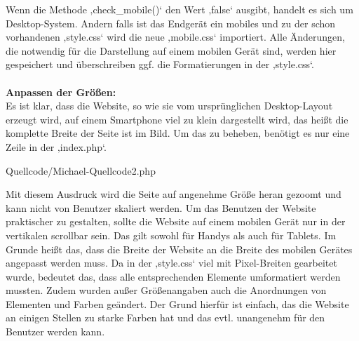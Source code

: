 Wenn die Methode ‚check\_mobile()‘ den Wert ‚false‘ ausgibt, handelt es sich um Desktop-System. Andern falls ist das Endgerät ein mobiles und zu der schon vorhandenen ‚style.css‘ wird die neue ‚mobile.css‘ importiert. Alle Änderungen, die notwendig für die Darstellung auf einem mobilen Gerät sind, werden hier gespeichert und überschreiben ggf. die Formatierungen in der ‚style.css‘. \\ \\

\textbf{Anpassen der Größen:}
\\
Es ist klar, dass die Website, so wie sie  vom ursprünglichen Desktop-Layout erzeugt wird, auf einem Smartphone viel zu klein dargestellt wird, das heißt die komplette Breite der Seite ist im Bild. Um das zu beheben, benötigt es nur eine Zeile in der ‚index.php‘.

\begin{center}
	\begin{lstinputlisting}[language=PHP, caption={Auszug aus der Index-Datei}]
		{Quellcode/Michael-Quellcode2.php}
	\end{lstinputlisting}
\end{center}

Mit diesem Ausdruck wird die Seite auf angenehme Größe heran gezoomt und kann nicht von Benutzer skaliert werden. 
Um das Benutzen der Website praktischer zu gestalten, sollte die Website auf einem mobilen Gerät nur in der vertikalen scrollbar sein. Das gilt sowohl für Handys als auch für Tablets. Im Grunde heißt das, dass die Breite der Website an die Breite des mobilen Gerätes angepasst werden muss. Da in der ‚style.css‘ viel mit Pixel-Breiten gearbeitet wurde, bedeutet das, dass alle entsprechenden Elemente umformatiert werden mussten.
Zudem wurden außer Größenangaben auch die Anordnungen von Elementen und Farben geändert. Der Grund hierfür ist einfach, das die Website an einigen Stellen zu starke Farben hat und das evtl. unangenehm für den Benutzer werden kann. 



